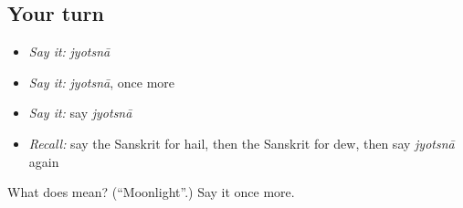 \subsection*{Your turn}
\begin{itemize}
\raggedright
  \item \emph{Say it:} \emph{jyotsnā}
  \item \emph{Say it:} \emph{jyotsnā}, once more
  \item \emph{Say it:} say \emph{jyotsnā}
  \item \emph{Recall:} say the Sanskrit for hail, then the Sanskrit for dew, then say \emph{jyotsnā} again
\end{itemize}

\begin{tcolorbox}[breakable,colback=teal!4,colframe=teal!35!black,title={Before you move on}]
What does  mean? (\textquotedblleft{}Moonlight\textquotedblright{}.) Say it once more.
\end{tcolorbox}
